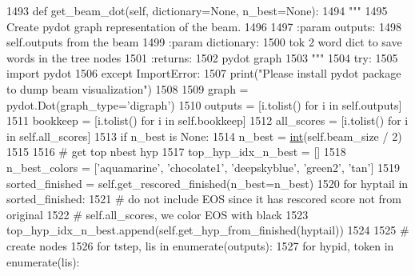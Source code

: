 \begin{DoxyCode}
1493     \textcolor{keyword}{def }get\_beam\_dot(self, dictionary=None, n\_best=None):
1494         \textcolor{stringliteral}{"""}
1495 \textcolor{stringliteral}{        Create pydot graph representation of the beam.}
1496 \textcolor{stringliteral}{}
1497 \textcolor{stringliteral}{        :param outputs:}
1498 \textcolor{stringliteral}{            self.outputs from the beam}
1499 \textcolor{stringliteral}{        :param dictionary:}
1500 \textcolor{stringliteral}{            tok 2 word dict to save words in the tree nodes}
1501 \textcolor{stringliteral}{        :returns:}
1502 \textcolor{stringliteral}{            pydot graph}
1503 \textcolor{stringliteral}{        """}
1504         \textcolor{keywordflow}{try}:
1505             \textcolor{keyword}{import} pydot
1506         \textcolor{keywordflow}{except} ImportError:
1507             print(\textcolor{stringliteral}{"Please install pydot package to dump beam visualization"})
1508 
1509         graph = pydot.Dot(graph\_type=\textcolor{stringliteral}{'digraph'})
1510         outputs = [i.tolist() \textcolor{keywordflow}{for} i \textcolor{keywordflow}{in} self.outputs]
1511         bookkeep = [i.tolist() \textcolor{keywordflow}{for} i \textcolor{keywordflow}{in} self.bookkeep]
1512         all\_scores = [i.tolist() \textcolor{keywordflow}{for} i \textcolor{keywordflow}{in} self.all\_scores]
1513         \textcolor{keywordflow}{if} n\_best \textcolor{keywordflow}{is} \textcolor{keywordtype}{None}:
1514             n\_best = \hyperlink{namespacelanguage__model_1_1eval__ppl_a7d12ee00479673c5c8d1f6d01faa272a}{int}(self.beam\_size / 2)
1515 
1516         \textcolor{comment}{# get top nbest hyp}
1517         top\_hyp\_idx\_n\_best = []
1518         n\_best\_colors = [\textcolor{stringliteral}{'aquamarine'}, \textcolor{stringliteral}{'chocolate1'}, \textcolor{stringliteral}{'deepskyblue'}, \textcolor{stringliteral}{'green2'}, \textcolor{stringliteral}{'tan'}]
1519         sorted\_finished = self.get\_rescored\_finished(n\_best=n\_best)
1520         \textcolor{keywordflow}{for} hyptail \textcolor{keywordflow}{in} sorted\_finished:
1521             \textcolor{comment}{# do not include EOS since it has rescored score not from original}
1522             \textcolor{comment}{# self.all\_scores, we color EOS with black}
1523             top\_hyp\_idx\_n\_best.append(self.get\_hyp\_from\_finished(hyptail))
1524 
1525         \textcolor{comment}{# create nodes}
1526         \textcolor{keywordflow}{for} tstep, lis \textcolor{keywordflow}{in} enumerate(outputs):
1527             \textcolor{keywordflow}{for} hypid, token \textcolor{keywordflow}{in} enumerate(lis):

\end{DoxyCode}
